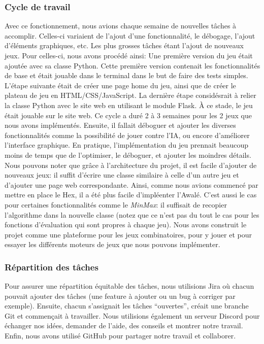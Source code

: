 \subsubsection{Cycle de travail}
Avec ce fonctionnement, nous avions chaque semaine de nouvelles tâches à accomplir. Celles-ci variaient de l'ajout d'une fonctionnalité, le débogage, l'ajout d'éléments graphiques, etc.
Les plus grosses tâches étant l'ajout de nouveaux jeux. Pour celles-ci, nous avons procédé ainsi:
Une première version du jeu était ajoutée avec sa classe Python. Cette première version contenait les fonctionnalités de base et était jouable dans le terminal dans le but de faire des tests simples. 
L'étape suivante était de créer une page home du jeu, ainsi que de créer le plateau de jeu en HTML/CSS/JavaScript. La dernière étape considésrait à relier la classe 
Python avec le site web en utilisant le module Flask.
À ce stade, le jeu était jouable sur le site web. Ce cycle a duré 2 à 3 semaines pour les 2 jeux que nous avons implémentés. Ensuite, il fallait déboguer et ajouter les 
diverses fonctionnalités comme la possibilité de jouer contre l'IA, ou encore d'améliorer l'interface graphique. En pratique, l'implémentation du jeu prennait beaucoup moins de temps que de l'optimiser, 
le déboguer, et ajouter les moindres détails.
Nous pouvons noter que grâce à l'architecture du projet, il est facile d'ajouter de nouveaux jeux: il suffit d'écrire une classe similaire à celle d'un autre jeu et d'ajouter une 
page web correspondante. Ainsi, comme nous avions commencé par mettre en place le Hex, il a été plus facile d'impléenter l'Awalé.
C'est aussi le cas pour certaines fonctionnalités comme le \emph{MinMax}: il suffisait de recopier l'algorithme dans la nouvelle classe (notez que ce n'est pas du 
tout le cas pour les fonctions d'évaluation qui sont propres à chaque jeu).
Nous avons construit le projet comme une plateforme pour les jeux combinatoires, pour y jouer et pour essayer les différents moteurs de jeux que nous pouvons implémenter.

\subsubsection{Répartition des tâches}
Pour assurer une répartition équitable des tâches, nous utilisions Jira où chacun pouvait ajouter des tâches (une feature à ajouter ou un bug à corriger par exemple). 
Ensuite, chacun s'assignait les tâches ``ouvertes'', créait une branche Git et commençait à travailler. Nous utilisions également un serveur Discord pour échanger 
nos idées, demander de l'aide, des conseils et montrer notre travail. Enfin, nous avons utilisé GitHub pour partager notre travail et collaborer.



